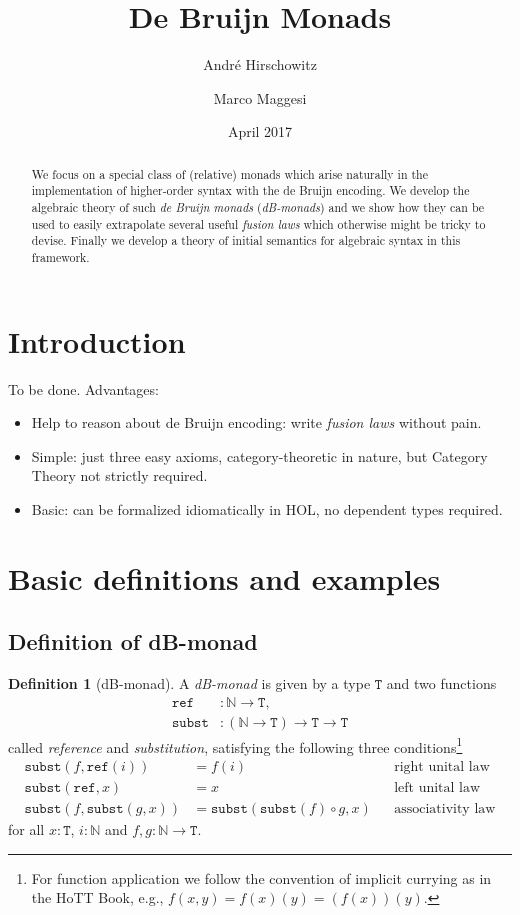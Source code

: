 \documentclass[a4paper,twoside,12pt]{article}
\title{De Bruijn Monads}
\author{Andr\'e Hirschowitz \and Marco Maggesi}
\date{April 2017}
\theoremstyle{definition}
\newtheorem{definition}{Definition}
\theoremstyle{remark}
\newcommand{\NN}{\mathbb{N}}
\newcommand{\subst}{\mathtt{subst}}
\newcommand{\refe}{\mathtt{ref}}
\newcommand{\TT}{\mathtt{T}}
\begin{document}
\maketitle

\begin{abstract}
  We focus on a special class of (relative) monads which arise
  naturally in the implementation of higher-order syntax with the de
  Bruijn encoding.  We develop the algebraic theory of such \emph{de
    Bruijn monads} (\emph{dB-monads}) and we show how they can be used
  to easily extrapolate several useful \emph{fusion laws} which
  otherwise might be tricky to devise.  Finally we develop a theory of
  initial semantics for algebraic syntax in this framework.
\end{abstract}

\tableofcontents{}

\section{Introduction}
\label{sec:intro}
To be done.
Advantages:
\begin{itemize}
\item Help to reason about de Bruijn encoding: write \emph{fusion
    laws} without pain.
\item Simple: just three easy axioms, category-theoretic in nature,
  but Category Theory not strictly required.
\item Basic: can be formalized idiomatically in HOL, no dependent
  types required.
\end{itemize}

\section{Basic definitions and examples}
\label{sec:basic-def}

\subsection{Definition of dB-monad}
\label{sec:basic-defin-example}

\begin{definition}[dB-monad]
  A \emph{dB-monad} is given by a type $\TT$ and two functions
  \begin{align*}
    \refe &\colon \NN \to \TT, \\
    \subst &\colon (\NN \to \TT) \to \TT \to \TT
  \end{align*}
  called \emph{reference} and \emph{substitution}, satisfying the
  following three conditions\footnote{For function application we
    follow the convention of implicit currying as in the HoTT Book,
    e.g., $f(x,y) = f(x)(y) = (f(x))(y)$.}
  \begin{align*}
    \subst(f,\refe(i)) &=  f(i)
    && \text{right unital law} \\
    \subst(\refe, x) &=  x
    && \text{left unital law} \\
    \subst(f, \subst(g, x)) &= \subst(\subst(f) \circ g, x)
    &&\text{associativity law}
  \end{align*}
  for all $x : \TT$, $i :\NN$ and $f,g\colon \NN \to \TT$.
\end{definition}
\end{document}
